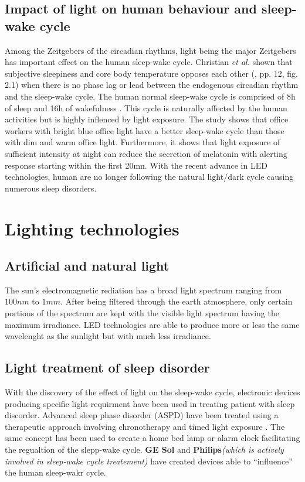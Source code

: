 \subsection{Impact of light on human behaviour and sleep-wake cycle}
Among the Zeitgebers of the circadian rhythms, light being the major Zeitgebers has important effect on the human sleep-wake cycle. Christian \textit{et al.}\cite{cir2014} shown that subjective sleepiness and core body temperature opposes each other (\cite{cir2014}, pp. 12, fig. 2.1) when there is no phase lag or lead between the endogenous circadian rhythm and the sleep-wake cycle. The human normal sleep-wake cycle is comprised of 8h of sleep and 16h of wakefulness \cite{is1995}. This cycle is naturally affected by the human activities but is highly inflenced by light exposure. The study shows that office workers with bright blue office light have a better sleep-wake cycle than those with dim and warm office light. Furthermore, it shows that light exposure of sufficient intensity at night can reduce the secretion of melatonin with alerting response starting within the first 20mn. With the recent advance in LED technologies, human are no longer following the natural light/dark cycle causing numerous sleep disorders. 

  
\section{Lighting technologies}

\subsection{Artificial and natural light}
The sun's electromagnetic rediation has a broad light spectrum ranging from  $100nm$ to $1mm$. After being filtered through the earth atmosphere, only certain portions of the spectrum are kept with the visible light spectrum having the maximum irradiance. LED technologies are able to produce more or less the same wavelenght as the sunlight but with much less irradiance. 

\subsection{Light treatment of sleep disorder}
With the discovery of the effect of light on the sleep-wake cycle, electronic devices producing specific light requirment have been used in treating patient with sleep discorder. Advanced sleep phase disorder (ASPD) have been treated using a therapeutic approach involving chronotherapy and timed light exposure \cite{th2010}. The same concept has been used to create a home bed lamp or alarm clock facilitating the regualtion of the slepp-wake cycle. \textbf{GE Sol} and \textbf{Philips}\textit{(which is actively involved in sleep-wake cycle treatement)} have created devices able to ``influence'' the human sleep-wakr cycle.

